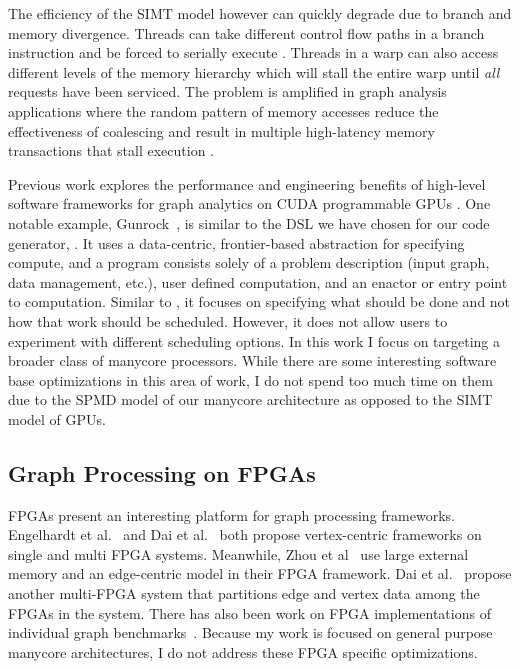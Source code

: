 The efficiency of the SIMT model however can quickly degrade due to branch and memory divergence. 
Threads can take different control flow paths in a branch instruction and be forced to serially execute \cite{fung2011thread}.
Threads in a warp can also access different levels of the memory hierarchy which will stall the entire warp until \textit{all} requests have been serviced.
The problem is amplified in graph analysis applications where the random pattern of memory accesses reduce the effectiveness of coalescing and result in multiple high-latency memory transactions that stall execution \cite{xu2014graph, shi2018graph}.

Previous work explores the performance and engineering benefits of high-level software frameworks for graph analytics on CUDA programmable GPUs \cite{wang2016gunrock, zhong2013medusa, nodehi2018tigr, yang2019graphblast, khorasani2014cusha}. 
One notable example, Gunrock~\cite{wang2016gunrock}, is similar to the DSL we have chosen for our code generator, \graphit. 
It uses a data-centric, frontier-based abstraction for specifying compute, and a program consists solely of a problem description (input graph, data management, etc.), user defined computation, and an enactor or entry point to computation.
Similar to \graphit, it focuses on specifying what should be done and not how that work should be scheduled. 
However, it does not allow users to experiment with different scheduling options.
In this work I focus on targeting a broader class of manycore processors.
While there are some interesting software base optimizations in this area of work, I do not spend too much time on them due to the SPMD model of our manycore architecture as opposed to the SIMT model of GPUs. 

\subsection{Graph Processing on FPGAs} FPGAs present an interesting platform for graph processing frameworks. Engelhardt et al.~\cite{engelhardt2016gravf} and Dai et al.~\cite{dai2016fpgp} both propose vertex-centric frameworks on single and multi FPGA systems.
Meanwhile, Zhou et al~\cite{zhou2016high} use large external memory and an edge-centric model in their FPGA framework. Dai et al.~\cite{dai2017foregraph} propose another multi-FPGA system that partitions edge and vertex data among the FPGAs in the system.
There has also been work on FPGA implementations of individual graph benchmarks~\cite{zhou2015optimizing, zhou2015accelerating}.
Because my work is focused on general purpose manycore architectures, I do not address these FPGA specific optimizations.

